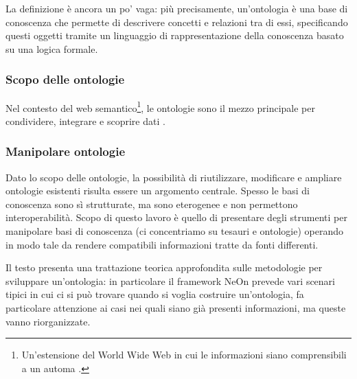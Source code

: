La definizione è ancora un po' vaga: più precisamente, un'ontologia è una base di conoscenza che permette di descrivere concetti e relazioni tra di essi, specificando questi oggetti tramite un linguaggio di rappresentazione della conoscenza basato su una logica formale.
\subsubsection{Scopo delle ontologie}
Nel contesto del web semantico\footnote{Un'estensione del World Wide Web in cui le informazioni siano comprensibili a un automa \cite{berners2001new}.}, le ontologie sono il mezzo principale per condividere, integrare e scoprire dati \cite{hitzler2021review}.
\subsubsection{Manipolare ontologie}
 Dato lo scopo delle ontologie, la possibilità di riutilizzare, modificare e ampliare ontologie esistenti risulta essere un argomento centrale. Spesso le basi di conoscenza sono sì strutturate, ma sono eterogenee e non permettono interoperabilità. Scopo di questo lavoro è quello di presentare degli strumenti per manipolare basi di conoscenza (ci concentriamo su tesauri e ontologie) operando in modo tale da rendere compatibili informazioni tratte da fonti differenti. 
 
 Il testo \cite{suarez2015neon} presenta una trattazione teorica approfondita sulle metodologie per sviluppare un'ontologia: in particolare il framework NeOn prevede vari scenari tipici in cui ci si può trovare quando si voglia costruire un'ontologia, fa particolare attenzione ai casi nei quali siano già presenti informazioni, ma queste vanno riorganizzate.
